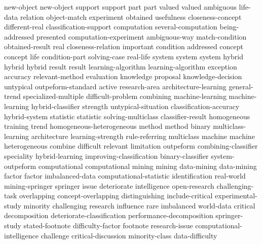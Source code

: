 new-object	new-object	
support	support	
part	part	
valued	valued	
ambiguous	
life-data	
relation	
object-match	
experiment	
obtained	
usefulness	
closeness-concept	
different-real	
classification-support	
computation	
several-computation	
being-addressed	
presented	
computation-experiment	
ambiguous-way	
match-condition	
obtained-result	
real	
closeness-relation	
important	
condition	
addressed	
concept	concept	
life	
condition-part	
solving-case	
real-life	
system	system	system	
hybrid	hybrid	hybrid	
result	result	
learning-algorithm	learning-algorithm	
exception	
accuracy	
relevant-method	
evaluation	
knowledge	
proposal	
knowledge-decision	
untypical	
outpeform-standard	
active	
research-area	
architecture-learning	
general-trend	
specialized-multiple	
difficult-problem	
combining	
machine-learning	machine-learning	
hybrid-classifier	
strength	
untypical-situation	
classification-accuracy	
hybrid-system	
statistic	statistic	
solving-multiclass	
classifier-result	
homogeneous	
training	
trend	
homogeneous-heterogeneous	
method	method	
binary	
multiclass-learning	
architecture	
learning-strength	
rule-referring	
multiclass	
machine	machine	
heterogeneous	
combine	
difficult	
relevant	
limitation	
outpeform	
combining-classifier	
speciality	
hybrid-learning	
improving-classification	
binary-classifier	
system-outpeform	
computational	computational	
mining	mining	
data-mining	data-mining	
factor	factor	
imbalanced-data	
computational-statistic	
identification	
real-world	
mining-springer	
springer	
issue	
deteriorate	
intelligence	
open-research	
challenging-task	
overlapping	
concept-overlapping	
distinguishing	
include-critical	
experimental-study	
minority	
challenging	
research	
influence	
rare	
imbalanced	
world-data	
critical	
decomposition	
deteriorate-classification	
performance-decomposition	
springer-study	
stated-footnote	
difficulty-factor	
footnote	
research-issue	
computational-intelligence	
challenge	
critical-discussion	
minority-class	
data-difficulty	
